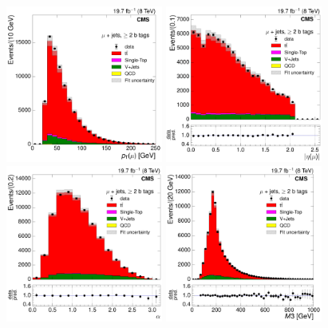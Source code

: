 \begin{figure}[hbtp]
    \centering
     \includegraphics[width=0.46\textwidth]{Chapters/07_08_09_Analysis/Images/control_plots/after_fit/8TeV/muon_pT_2orMoreBtags_with_ratio}\hfill
     \includegraphics[width=0.46\textwidth]{Chapters/07_08_09_Analysis/Images/control_plots/after_fit/8TeV/muon_AbsEta_2orMoreBtags_with_ratio}\\                            
     \includegraphics[width=0.46\textwidth]{Chapters/07_08_09_Analysis/Images/control_plots/after_fit/8TeV/MuPlusJets_angle_bl_2orMoreBtags_with_ratio}\hfill
     \includegraphics[width=0.46\textwidth]{Chapters/07_08_09_Analysis/Images/control_plots/after_fit/8TeV/MuPlusJets_M3_2orMoreBtags_with_ratio}\\     

\end{figure}
